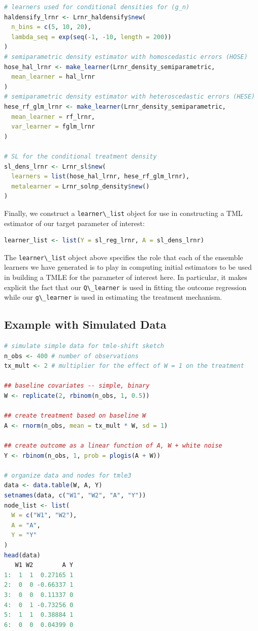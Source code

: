 \documentclass[
  12pt, krantz2,
]{krantz}
\newcommand{\passthrough}[1]{#1}
\newcommand{\1}{\mathbbm{1}}
\theoremstyle{definition}
\theoremstyle{definition}
\theoremstyle{definition}
\theoremstyle{definition}
\theoremstyle{remark}
\begin{document}
\begin{lstlisting}[language=R]
# learners used for conditional densities for (g_n)
haldensify_lrnr <- Lrnr_haldensify$new(
  n_bins = c(5, 10, 20),
  lambda_seq = exp(seq(-1, -10, length = 200))
)
# semiparametric density estimator with homoscedastic errors (HOSE)
hose_hal_lrnr <- make_learner(Lrnr_density_semiparametric,
  mean_learner = hal_lrnr
)
# semiparametric density estimator with heteroscedastic errors (HESE)
hese_rf_glm_lrnr <- make_learner(Lrnr_density_semiparametric,
  mean_learner = rf_lrnr,
  var_learner = fglm_lrnr
)

# SL for the conditional treatment density
sl_dens_lrnr <- Lrnr_sl$new(
  learners = list(hose_hal_lrnr, hese_rf_glm_lrnr),
  metalearner = Lrnr_solnp_density$new()
)
\end{lstlisting}

Finally, we construct a \passthrough{\lstinline!learner\_list!} object for use in constructing a TML
estimator of our target parameter of interest:

\begin{lstlisting}[language=R]
learner_list <- list(Y = sl_reg_lrnr, A = sl_dens_lrnr)
\end{lstlisting}

The \passthrough{\lstinline!learner\_list!} object above specifies the role that each of the ensemble
learners we have generated is to play in computing initial estimators to be
used in building a TMLE for the parameter of interest here. In particular, it
makes explicit the fact that our \passthrough{\lstinline!Q\_learner!} is used in fitting the outcome
regression while our \passthrough{\lstinline!g\_learner!} is used in estimating the treatment mechanism.

\hypertarget{example-with-simulated-data}{%
\subsection{Example with Simulated Data}\label{example-with-simulated-data}}

\begin{lstlisting}[language=R]
# simulate simple data for tmle-shift sketch
n_obs <- 400 # number of observations
tx_mult <- 2 # multiplier for the effect of W = 1 on the treatment

## baseline covariates -- simple, binary
W <- replicate(2, rbinom(n_obs, 1, 0.5))

## create treatment based on baseline W
A <- rnorm(n_obs, mean = tx_mult * W, sd = 1)

## create outcome as a linear function of A, W + white noise
Y <- rbinom(n_obs, 1, prob = plogis(A + W))

# organize data and nodes for tmle3
data <- data.table(W, A, Y)
setnames(data, c("W1", "W2", "A", "Y"))
node_list <- list(
  W = c("W1", "W2"),
  A = "A",
  Y = "Y"
)
head(data)
   W1 W2        A Y
1:  1  1  0.27165 1
2:  0  0 -0.66337 1
3:  0  0  0.11337 0
4:  0  1 -0.73256 0
5:  1  1  0.38884 1
6:  0  0  0.04399 0
\end{lstlisting}
\end{document}
